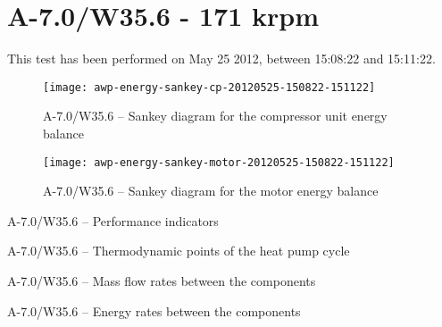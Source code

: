 
\section{A-7.0/W35.6 - 171 krpm}
\label{sec:awp-exp-details-A-7.0/W35.6}

This test has been performed on May 25\th{} 2012, between 15:08:22 and
15:11:22.

\begin{figure}[htbp]
  \centering
  \texttt{[image: awp-energy-sankey-cp-20120525-150822-151122]}
  \caption{A-7.0/W35.6 -- Sankey diagram for the compressor unit energy balance}
  \label{fig:awp-A-7.0/W35.6-sankey-cp}
\end{figure}

\begin{figure}[htbp]
  \centering
  \texttt{[image: awp-energy-sankey-motor-20120525-150822-151122]}
  \caption{A-7.0/W35.6 -- Sankey diagram for the motor energy balance}
  \label{fig:awp-A-7.0/W35.6-sankey-motor}
\end{figure}

\begin{table}[htbp]
    \footnotesize
    \begin{center}
    
  \end{center}
  \caption{A-7.0/W35.6 -- Performance indicators}
\end{table}

\begin{table}[htbp]
  \footnotesize
  \begin{center}
    
  \end{center}
  \caption{A-7.0/W35.6 -- Thermodynamic points of the heat pump cycle}
\end{table}


\begin{table}[htbp]
    \footnotesize
    \begin{center}
    
  \end{center}
  \caption{A-7.0/W35.6 -- Mass flow rates between the components}
\end{table}

\begin{table}[htbp]
    \footnotesize
    \begin{center}
    
  \end{center}
  \caption{A-7.0/W35.6 -- Energy rates between the components}
\end{table}

\FloatBarrier
